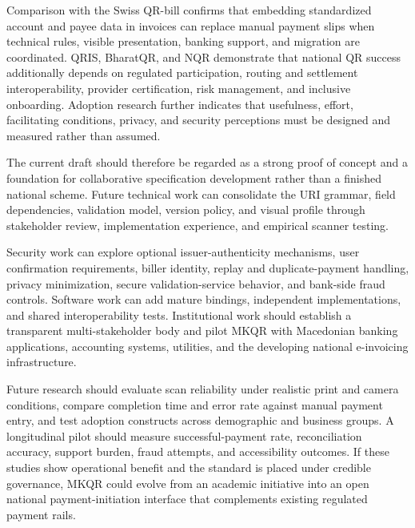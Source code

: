 Comparison with the Swiss QR-bill confirms that embedding standardized account and payee data in invoices can replace manual payment slips when technical rules, visible presentation, banking support, and migration are coordinated. QRIS, BharatQR, and NQR demonstrate that national QR success additionally depends on regulated participation, routing and settlement interoperability, provider certification, risk management, and inclusive onboarding. Adoption research further indicates that usefulness, effort, facilitating conditions, privacy, and security perceptions must be designed and measured rather than assumed.

The current draft should therefore be regarded as a strong proof of concept and a foundation for collaborative specification development rather than a finished national scheme. Future technical work can consolidate the URI grammar, field dependencies, validation model, version policy, and visual profile through stakeholder review, implementation experience, and empirical scanner testing.

Security work can explore optional issuer-authenticity mechanisms, user confirmation requirements, biller identity, replay and duplicate-payment handling, privacy minimization, secure validation-service behavior, and bank-side fraud controls. Software work can add mature bindings, independent implementations, and shared interoperability tests. Institutional work should establish a transparent multi-stakeholder body and pilot MKQR with Macedonian banking applications, accounting systems, utilities, and the developing national e-invoicing infrastructure.

Future research should evaluate scan reliability under realistic print and camera conditions, compare completion time and error rate against manual payment entry, and test adoption constructs across demographic and business groups. A longitudinal pilot should measure successful-payment rate, reconciliation accuracy, support burden, fraud attempts, and accessibility outcomes. If these studies show operational benefit and the standard is placed under credible governance, MKQR could evolve from an academic initiative into an open national payment-initiation interface that complements existing regulated payment rails.

